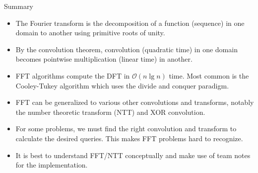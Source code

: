 \documentclass[10pt,table]{beamer}
\begin{document}
\begin{frame}{Summary}
\begin{itemize}
	\item The Fourier transform is the decomposition of a function (sequence) in one domain to another using primitive roots of unity.
	\item By the convolution theorem, convolution (quadratic time) in one domain becomes pointwise multiplication (linear time) in another.
	\item FFT algorithms compute the DFT in $\mathcal{O}(n\lg n)$ time. Most common is the Cooley-Tukey algorithm which uses the divide and conquer paradigm.
	\item FFT can be generalized to various other convolutions and transforms, notably the number theoretic transform (NTT) and XOR convolution.
	\item For some problems, we must find the right convolution and transform to calculate the desired queries. This makes FFT problems hard to recognize.
	\item It is best to understand FFT/NTT conceptually and make use of team notes for the implementation.
\end{itemize}
\end{frame}
\end{document}
